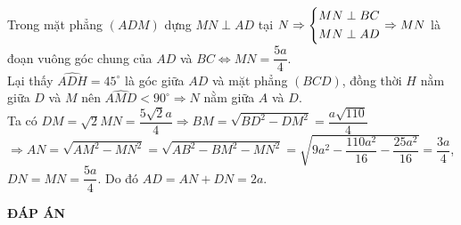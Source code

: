 \begin{ex}
{Trong mặt phẳng $(ADM)$ dựng $MN \perp AD$ tại $N \Rightarrow \left\{\begin{aligned} &MN \perp BC \\ & MN \perp AD \end{aligned}\right. \Rightarrow MN$ là đoạn vuông góc chung của $AD$ và $BC \Leftrightarrow MN = \dfrac{5a}{4}$.\\
Lại thấy $\widehat{ADH} = 45^\circ$ là góc giữa $AD$ và mặt phẳng $(BCD)$, đồng thời $H$ nằm giữa $D$ và $M$ nên $\widehat{AMD} < 90^\circ \Rightarrow N$ nằm giữa $A$ và $D$.\\
Ta có $DM = \sqrt{2} MN = \dfrac{5\sqrt{2}a}{4} \Rightarrow BM = \sqrt{BD^2-DM^2} = \dfrac{a\sqrt{110}}{4}$\\
$ \Rightarrow AN = \sqrt{AM^2-MN^2} = \sqrt{AB^2 - BM^2 - MN^2} = \sqrt{9a^2 - \dfrac{110a^2}{16} - \dfrac{25a^2}{16} } = \dfrac{3a}{4}$,\\ $DN = MN = \dfrac{5a}{4}$. Do đó $AD = AN + DN = 2a$.
}
\end{ex}

\newpage
\begin{center}
	\textbf{ĐÁP ÁN}
\end{center}
\begin{multicols}{10}
	 
\end{multicols}